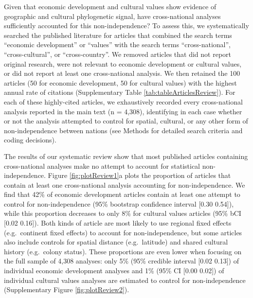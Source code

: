 \documentclass[
  man,floatsintext]{apa6}
\begin{document}
Given that economic development and cultural values show evidence of geographic and cultural phylogenetic signal, have cross-national analyses sufficiently accounted for this non-independence? To assess this, we systematically searched the published literature for articles that combined the search terms ``economic development'' or ``values'' with the search terms ``cross-national'', ``cross-cultural'', or ``cross-country''. We removed articles that did not report original research, were not relevant to economic development or cultural values, or did not report at least one cross-national analysis. We then retained the 100 articles (50 for economic development, 50 for cultural values) with the highest annual rate of citations (Supplementary Table \ref{tab:tableArticlesReview}). For each of these highly-cited articles, we exhaustively recorded every cross-national analysis reported in the main text (n = 4,308), identifying in each case whether or not the analysis attempted to control for spatial, cultural, or any other form of non-independence between nations (see Methods for detailed search criteria and coding decisions).

The results of our systematic review show that most published articles containing cross-national analyses make no attempt to account for statistical non-independence. Figure \ref{fig:plotReview1}a plots the proportion of articles that contain at least one cross-national analysis accounting for non-independence. We find that 42\% of economic development articles contain at least one attempt to control for non-independence (95\% bootstrap confidence interval {[}0.30 0.54{]}), while this proportion decreases to only 8\% for cultural values articles (95\% bCI {[}0.02 0.16{]}). Both kinds of article are most likely to use regional fixed effects (e.g.~continent fixed effects) to account for non-independence, but some articles also include controls for spatial distance (e.g.~latitude) and shared cultural history (e.g.~colony status). These proportions are even lower when focusing on the full sample of 4,308 analyses: only 5\% (95\% credible interval {[}0.02 0.13{]}) of individual economic development analyses and 1\% (95\% CI {[}0.00 0.02{]}) of individual cultural values analyses are estimated to control for non-independence (Supplementary Figure \ref{fig:plotReview2}).
\end{document}
